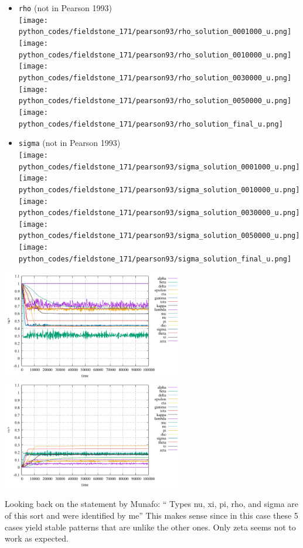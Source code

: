 \begin{itemize}
\item {\tt rho} (not in Pearson 1993)\\
\texttt{[image: python\_codes/fieldstone\_171/pearson93/rho\_solution\_0001000\_u.png]}
\texttt{[image: python\_codes/fieldstone\_171/pearson93/rho\_solution\_0010000\_u.png]}
\texttt{[image: python\_codes/fieldstone\_171/pearson93/rho\_solution\_0030000\_u.png]}
\texttt{[image: python\_codes/fieldstone\_171/pearson93/rho\_solution\_0050000\_u.png]}
\texttt{[image: python\_codes/fieldstone\_171/pearson93/rho\_solution\_final\_u.png]}

\item {\tt sigma} (not in Pearson 1993)\\
\texttt{[image: python\_codes/fieldstone\_171/pearson93/sigma\_solution\_0001000\_u.png]}
\texttt{[image: python\_codes/fieldstone\_171/pearson93/sigma\_solution\_0010000\_u.png]}
\texttt{[image: python\_codes/fieldstone\_171/pearson93/sigma\_solution\_0030000\_u.png]}
\texttt{[image: python\_codes/fieldstone\_171/pearson93/sigma\_solution\_0050000\_u.png]}
\texttt{[image: python\_codes/fieldstone\_171/pearson93/sigma\_solution\_final\_u.png]}

\end{itemize}

\includegraphics[width=8cm]{python_codes/fieldstone_171/pearson93/stats_u.pdf}
\includegraphics[width=8cm]{python_codes/fieldstone_171/pearson93/stats_v.pdf}


Looking back on the statement by Munafo: ``
Types nu, xi, pi, rho, and sigma are of this sort and were identified by me''
This makes sense since in this case these 5 cases yield stable patterns 
that are unlike the other ones.
Only zeta seems not to work as expected.


